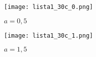 \documentclass[a4paper]{report}
\begin{document}

\begin{figure}[H]
    \centering
    \texttt{[image: lista1\_30c\_0.png]}
    \caption{$a=0,5$}
    \label{fig:lista1_30c_0-png}
\end{figure}

\begin{figure}[H]
    \centering
    \texttt{[image: lista1\_30c\_1.png]}
    \caption{$a=1,5$}
    \label{fig:lista1_30c_0-png}
\end{figure}
\end{document}
